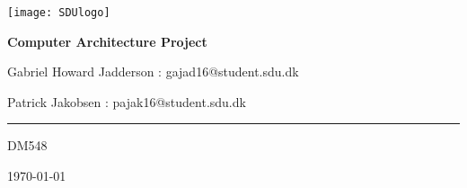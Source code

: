 \begin{titlepage}
	\centering
	\texttt{[image: SDUlogo]}\par\vspace{0.5cm} %
	{\huge\bfseries Computer Architecture Project\par}
	\vspace{0.5cm}
	{\small Gabriel Howard Jadderson : gajad16@student.sdu.dk\par}
	{\small Patrick Jakobsen : pajak16@student.sdu.dk\par}
  {\rule{10.0cm}{0.1mm}\par}
	{\small DM548\par}
	{\small \today\par}
	\vspace{1cm}
\end{titlepage}

